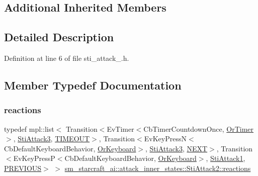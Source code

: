 \subsection*{Additional Inherited Members}


\subsection{Detailed Description}


Definition at line 6 of file sti\+\_\+attack\+\_.\+h.



\subsection{Member Typedef Documentation}
\mbox{\label{structsm__starcraft__ai_1_1attack__inner__states_1_1StiAttack2_a978f087e297634bc2e93830ee485a799}} 
\subsubsection{\texorpdfstring{reactions}{reactions}}
{\footnotesize\ttfamily typedef mpl\+::list$<$ Transition$<$Ev\+Timer$<$Cb\+Timer\+Countdown\+Once, \hyperlink{classsm__starcraft__ai_1_1OrTimer}{Or\+Timer}$>$, \hyperlink{structsm__starcraft__ai_1_1attack__inner__states_1_1StiAttack3}{Sti\+Attack3}, \hyperlink{structsm__starcraft__ai_1_1attack__inner__states_1_1StiAttack2_1_1TIMEOUT}{T\+I\+M\+E\+O\+UT}$>$, Transition$<$Ev\+Key\+PressN$<$Cb\+Default\+Keyboard\+Behavior, \hyperlink{classsm__starcraft__ai_1_1OrKeyboard}{Or\+Keyboard}$>$, \hyperlink{structsm__starcraft__ai_1_1attack__inner__states_1_1StiAttack3}{Sti\+Attack3}, \hyperlink{structsm__starcraft__ai_1_1attack__inner__states_1_1StiAttack2_1_1NEXT}{N\+E\+XT}$>$, Transition$<$Ev\+Key\+PressP$<$Cb\+Default\+Keyboard\+Behavior, \hyperlink{classsm__starcraft__ai_1_1OrKeyboard}{Or\+Keyboard}$>$, \hyperlink{structsm__starcraft__ai_1_1attack__inner__states_1_1StiAttack1}{Sti\+Attack1}, \hyperlink{structsm__starcraft__ai_1_1attack__inner__states_1_1StiAttack2_1_1PREVIOUS}{P\+R\+E\+V\+I\+O\+US}$>$ $>$ \hyperlink{structsm__starcraft__ai_1_1attack__inner__states_1_1StiAttack2_a978f087e297634bc2e93830ee485a799}{sm\+\_\+starcraft\+\_\+ai\+::attack\+\_\+inner\+\_\+states\+::\+Sti\+Attack2\+::reactions}}



